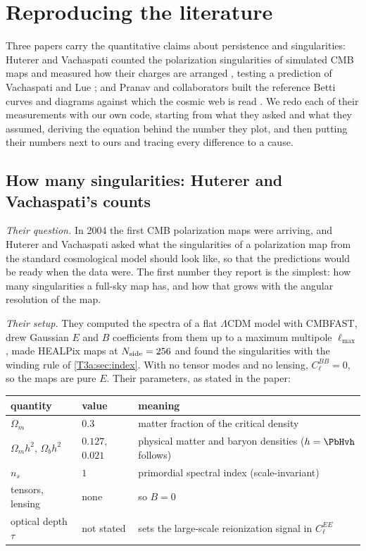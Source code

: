 \section{Reproducing the literature}
\label{12b:sec:repro}

Three papers carry the quantitative claims about persistence and singularities: Huterer and Vachaspati counted the polarization
singularities of simulated CMB maps and measured how their charges are arranged \cite{HutererVachaspati2005}, testing
a prediction of Vachaspati and Lue \cite{VachaspatiLue2003}; and Pranav and collaborators built the reference
Betti curves and diagrams against which the cosmic web is read \cite{Pranav2017}. We redo each of their measurements with our own
code, starting from what they asked and what they assumed, deriving the equation behind the number they plot, and then
putting their numbers next to ours and tracing every difference to a cause.

\subsection{How many singularities: Huterer and Vachaspati's counts}
\label{12b:sec:repro-hv}

\emph{Their question.} In 2004 the first CMB polarization maps were arriving, and Huterer and Vachaspati asked what
the singularities of a polarization map from the standard cosmological model should look like, so that the
predictions would be ready when the data were. The first number they report is the simplest: how many singularities a
full-sky map has, and how that grows with the angular resolution of the map.

\emph{Their setup.} They computed the spectra of a flat $\Lambda$CDM model with CMBFAST, drew Gaussian $E$ and $B$
coefficients from them up to a maximum multipole $\ell_{\max}$, made HEALPix maps at $N_{\rm side}=256$ and found the
singularities with the winding rule of \cref{T3a:sec:index}. With no tensor modes and no lensing, $C_\ell^{BB}=0$, so
the maps are pure $E$. Their parameters, as stated in the paper:

\begin{center}
\small
\begin{tabular}{lll}
\toprule
quantity & value & meaning\\
\midrule
$\Omega_m$ & $0.3$ & matter fraction of the critical density\\
$\Omega_mh^2$, $\Omega_bh^2$ & $0.127$, $0.021$ & physical matter and baryon densities ($h=\PbHvh$ follows)\\
$n_s$ & $1$ & primordial spectral index (scale-invariant)\\
tensors, lensing & none & so $B=0$\\
optical depth $\tau$ & not stated & sets the large-scale reionization signal in $C_\ell^{EE}$\\
\bottomrule
\end{tabular}
\end{center}

